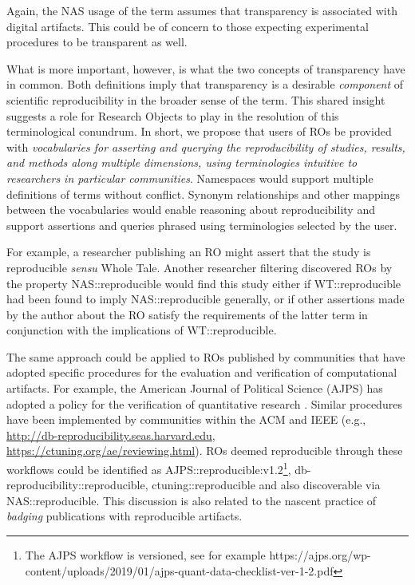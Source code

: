\noindent Again, the NAS usage of the term assumes that transparency is associated with digital artifacts.
This could be of concern to those expecting experimental procedures to be transparent as well.

What is more important, however, is what the two concepts of transparency have in common.
Both definitions imply that transparency is a desirable \emph{component} of scientific reproducibility in the broader sense of the term.
This shared insight suggests a role for Research Objects to play in the resolution of this terminological conundrum.
In short, we propose that users of ROs be provided with \emph{vocabularies for asserting and querying the reproducibility
   of studies, results, and methods along multiple dimensions, using terminologies intuitive to researchers in particular communities}.
Namespaces would support multiple definitions of terms without conflict.
Synonym relationships and other mappings between the vocabularies would enable reasoning about reproducibility
	 and support assertions and queries phrased using terminologies selected by the user.

For example, a researcher publishing an RO might assert that the study is reproducible \emph{sensu} \textsf{Whole Tale}.  Another researcher filtering discovered ROs by the property \textsf{NAS::reproducible} would find this study
    either if \textsf{WT::reproducible} had been found to imply \textsf{NAS::reproducible} generally, or if other assertions made by the author
    about the RO satisfy the requirements of the latter term in conjunction with the implications of \textsf{WT::reproducible}.


The same approach could be applied to ROs published by communities that have adopted specific procedures
    for the evaluation and verification of computational artifacts. For example, the American Journal of
    Political Science (AJPS) has adopted a policy for the verification of quantitative research \cite{christian2018}.
    Similar procedures have been implemented by communities within the ACM and IEEE
    (e.g., \url{http://db-reproducibility.seas.harvard.edu},
    \url{https://ctuning.org/ae/reviewing.html}). ROs deemed reproducible through these workflows could be
    identified as \textsf{AJPS::reproducible:v1.2}\footnote{The AJPS workflow is versioned, see for
    example https://ajps.org/wp-content/uploads/2019/01/ajps-quant-data-checklist-ver-1-2.pdf},
    \textsf{db-reproducibility::reproducible}, \textsf{ctuning::reproducible} and also discoverable via
    \textsf{NAS::reproducible}. This discussion is also related to the nascent practice of \emph{badging}
    publications with reproducible artifacts.

